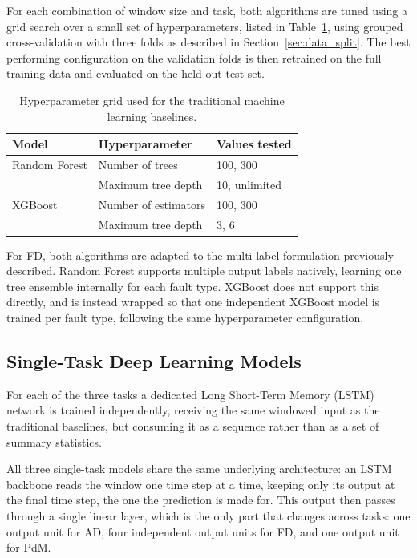 For each combination of window size and task, both algorithms are tuned using a grid search 
over a small set of hyperparameters, listed in Table~\ref{tab:ml_baseline_grid}, using grouped 
cross-validation with three folds as described in Section~\ref{sec:data_split}. The best performing 
configuration on the validation folds is then retrained on the full training data and evaluated on the 
held-out test set.

\begin{table}[htbp]
\centering
\caption{Hyperparameter grid used for the traditional machine learning baselines.}
\label{tab:ml_baseline_grid}
\small
\begin{tabular}{lll}
\hline
\textbf{Model} & \textbf{Hyperparameter} & \textbf{Values tested} \\
\hline
Random Forest & Number of trees      & 100, 300 \\
              & Maximum tree depth   & 10, unlimited \\
XGBoost       & Number of estimators & 100, 300 \\
              & Maximum tree depth   & 3, 6 \\
\hline
\end{tabular}
\end{table}

For FD, both algorithms are adapted to the multi label formulation previously described. Random Forest supports multiple output 
labels natively, learning one tree ensemble internally for each fault type. XGBoost does not support this directly, and is instead 
wrapped so that one independent XGBoost model is trained per fault type, following the same hyperparameter 
configuration.

\subsection{Single-Task Deep Learning Models} \label{sec:stl_models}

For each of the three tasks a dedicated Long Short-Term 
Memory (LSTM) network is trained independently, receiving the same windowed input as the traditional 
baselines, but consuming it as a sequence rather than as a set of summary statistics.

All three single-task models share the same underlying architecture: an LSTM backbone reads the window 
one time step at a time, keeping only its output at the final time step, the one the prediction is made 
for. This output then passes through a single linear 
layer, which is the only part that changes across tasks: one output unit for AD, four 
independent output units for FD, and one output unit for PdM.

